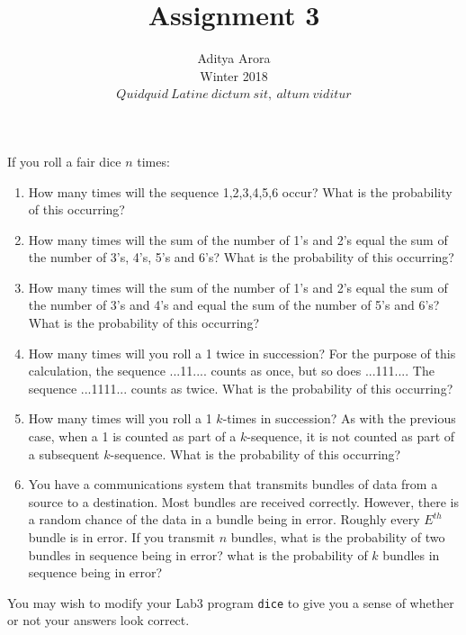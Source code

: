 \documentclass[10pt]{article}
\newenvironment{problem}[2][Problem]{\begin{trivlist}
\item[\hskip \labelsep {\bfseries #1}\hskip \labelsep {\bfseries #2.}]}{\end{trivlist}}
\begin{document}
 
 
\title{Assignment 3}%
\author{Aditya Arora\\ %
Winter 2018\\$Quidquid\ Latine\ dictum\ sit,\ altum\ viditur$} %
\maketitle

\begin{problem}{1}
If you roll a fair dice $n$ times:
\begin{enumerate}
    \parskip=0in
    \parsep=0in
    \itemsep=0.1in
    \item How many times will the sequence 1,2,3,4,5,6 occur?  What is the probability of this occurring?
    \item How many times will the sum of the number of 1's and 2's equal the sum of the number of 3's, 4's, 5's and 6's?  What is the probability of this occurring?
    \item How many times will the sum of the number of 1's and 2's equal the sum of the number of 3's and 4's and equal the sum of the number of 5's and 6's?  What is the probability of this occurring?
    \item How many times will you roll a 1 twice in succession?  For the purpose of this calculation, the sequence ...11.... counts as once, but so does ...111....  The sequence ...1111... counts as twice.  What is the probability of this occurring?
    \item How many times will you roll a 1 $k$-times in succession?  As with the previous case, when a 1 is counted as part of a $k$-sequence, it is not counted as part of a subsequent $k$-sequence.  What is the probability of this occurring?
    \item You have a communications system that transmits bundles of data from a source to a destination.  Most bundles are received correctly. However, there is a random chance of the data in a bundle being in error.  Roughly every $E^{th}$ bundle is in error.  If you transmit $n$ bundles, what is the probability of two bundles in sequence being in error?  what is the probability of $k$ bundles in sequence being in error?
\end{enumerate}

You may wish to modify your Lab3 program {\tt dice} to give you a
sense of whether or not your answers look correct.
\end{problem}
\end{document}
